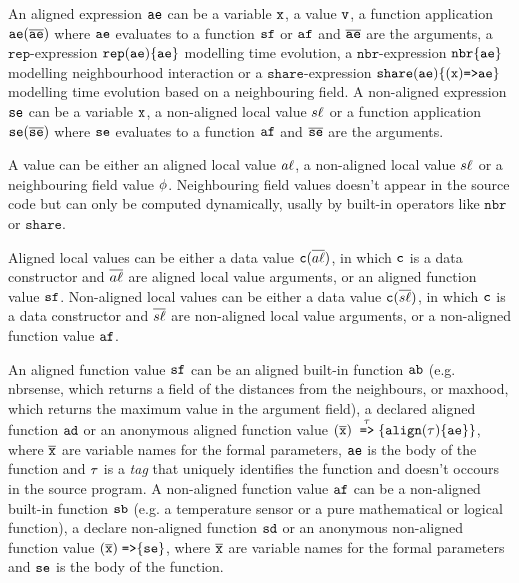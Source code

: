 An aligned expression $\mathtt{ae}$ can be a variable $\mathtt{x}$, a value $\mathtt{v}$, a function application $\mathtt{ae}(\overline{\mathtt{ae}})$ where $\mathtt{ae}$ evaluates to a function $\mathtt{sf}$ or $\mathtt{af}$ and $\overline{\mathtt{ae}}$ are the arguments, a $\mathtt{rep}$-expression $\mathtt{rep}(\mathtt{ae})\{ \mathtt{ae} \}$ modelling time evolution, a $\mathtt{nbr}$-expression $\mathtt{nbr}\{\mathtt{ae}\}$ modelling neighbourhood interaction or a $\mathtt{share}$-expression $\mathtt{share}(\mathtt{ae})\{(\mathtt{x}) \mathrm{ \texttt{=>}\mathtt{ae} } \}$ modelling time evolution based on a neighbouring field. A non-aligned expression $\mathtt{se}$ can be a variable $\mathtt{x}$, a non-aligned local value $s\ell$ or a function application $\mathtt{se}(\overline{\mathtt{se}})$ where $\mathtt{se}$ evaluates to a function $\mathtt{af}$ and $\overline{\mathtt{se}}$ are the arguments.

A value can be either an aligned local value $a\ell$, a non-aligned local value $s\ell$ or a neighbouring field value $\phi$. Neighbouring field values doesn't appear in the source code but can only be computed dynamically, usally by built-in operators like $\mathtt{nbr}$ or $\mathtt{share}$.

Aligned local values can be either a data value $\mathtt{c}(\overline{a\ell})$, in which $\mathtt{c}$ is a data constructor and $\overline{a\ell}$ are aligned local value arguments, or an aligned function value $\mathtt{sf}$. Non-aligned local values can be either a data value $\mathtt{c}(\overline{s\ell})$, in which $\mathtt{c}$ is a data constructor and $\overline{s\ell}$ are non-aligned local value arguments, or a non-aligned function value $\mathtt{af}$.

An aligned function value $\mathtt{sf}$ can be an aligned built-in function $\mathtt{ab}$ (e.g. nbrsense, which returns a field of the distances from the neighbours, or maxhood, which returns the maximum value in the argument field), a declared aligned function $\mathtt{ad}$ or an anonymous aligned function value $ (\overline{\mathtt{x}}) \; \stackrel{\tau}{\mathrm{\texttt{=>}}}{\{\mathtt{align}(\tau)\{\mathtt{ae}\}\}}$, where $\overline{\mathtt{x}}$ are variable names for the formal parameters, $\mathtt{ae}$ is the body of the function and $\tau$ is a \textit{tag} that uniquely identifies the function and doesn't occours in the source program. A non-aligned function value $\mathtt{af}$ can be a non-aligned built-in function $\mathtt{sb}$ (e.g. a temperature sensor or a pure mathematical or logical function), a declare non-aligned function $\mathtt{sd}$ or an anonymous non-aligned function value $(\overline{\mathtt{x}}) \; \mathrm{ \texttt{=>}\{ } \mathtt{se} \}$, where $\overline{\mathtt{x}}$ are variable names for the formal parameters and $\mathtt{se}$ is the body of the function.

